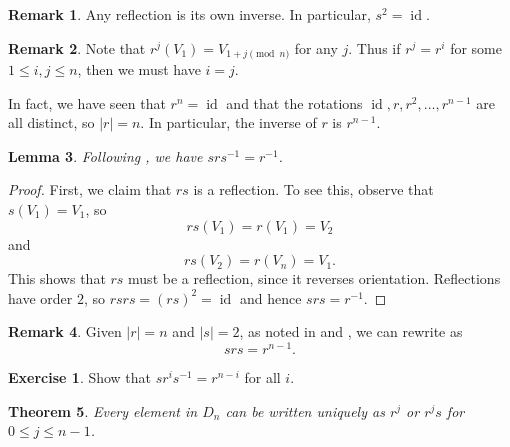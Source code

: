 \documentclass[12pt]{report}
\newtheorem{theorem}{Theorem}[chapter]
\newtheorem{lemma}[theorem]{Lemma}
\numberwithin{equation}{section}
\numberwithin{theorem}{chapter}
\theoremstyle{definition}
\newtheorem{exercise}{Exercise}
\newtheorem*{basic properties}{Basic Properties}
\newtheorem*{Important Remark}{Important Remark}
\newtheorem{remark}[theorem]{Remark}
\DeclareMathOperator{\id}{id}
\begin{document}
\begin{remark}\label{reflections have order 2}
	Any reflection is its own inverse. In particular, $s^2 = \id$.
\end{remark}

\begin{remark}\label{rotations have order n}
	Note that $r^j(V_1) = V_{1+j \pmod{n}}$ for any $j$. Thus if $r^j = r^i$ for some $1 \leqslant i,j \leqslant n$, then we must have $i=j$.	

	In fact, we have seen that $r^n = \id$ and that the rotations $\id, r, r^2, \ldots, r^{n-1}$ are all distinct, so $|r| = n$. In particular, the inverse of $r$ is $r^{n-1}$.
\end{remark}



\begin{lemma}\label{dihedral groups product lemma}
Following , we have $srs^{-1} = r^{-1}$.
\end{lemma}

\begin{proof}


First, we claim that $rs$ is a reflection. To see this, observe that $s(V_1) = V_1$, so
$$rs(V_1) = r(V_1) = V_2$$ 
and 
$$rs(V_{2}) = r(V_{n}) = V_1.$$
This shows that $rs$ must be a reflection, since it reverses orientation.
Reflections have order $2$, so $rsrs = (rs)^2 = \id$ and hence $srs = r^{-1}$.
\end{proof}


\begin{remark}
	Given $|r| = n$ and $|s| = 2$, as noted in  and , we can rewrite  as
	$$srs = r^{n-1}.$$
\end{remark}


\begin{exercise}\label{conjugate r^i by s}
	Show that $s r^i s^{-1} = r^{n-i}$ for all $i$.
\end{exercise}


\begin{theorem}\label{Dnelements in terms of r and s}
Every element in $D_n$ can be written uniquely as $r^j$ or $r^js$ for $0 \leqslant j \leqslant n-1$.
\end{theorem}
\end{document}
